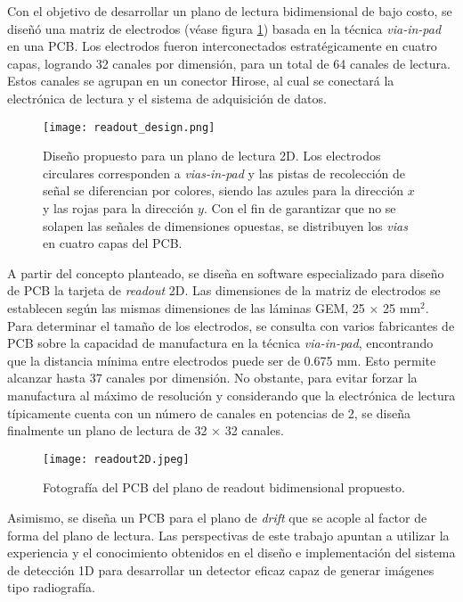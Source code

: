 \documentclass{report}
\begin{document}
\noindent Con el objetivo de desarrollar un plano de lectura bidimensional de bajo costo, se diseñó una matriz de electrodos (véase figura \ref{fig:readout_design}) basada en la técnica \textit{via-in-pad} en una PCB. Los electrodos fueron interconectados estratégicamente en cuatro capas, logrando 32 canales por dimensión, para un total de 64 canales de lectura. Estos canales se agrupan en un conector Hirose, al cual se conectará la electrónica de lectura y el sistema de adquisición de datos.  

\begin{figure}[H]
    \centering
    \texttt{[image: readout\_design.png]}
    \caption{Diseño propuesto para un plano de lectura 2D. Los electrodos circulares corresponden a \textit{vias-in-pad} y las pistas de recolección de señal se diferencian por colores, siendo las azules para la dirección $x$ y las rojas para la dirección $y$. Con el fin de garantizar que no se solapen las señales de dimensiones opuestas, se distribuyen los \textit{vias} en cuatro capas del PCB.  
    }
    \label{fig:readout_design}
\end{figure}

\noindent A partir del concepto planteado, se diseña en software especializado para diseño de PCB la tarjeta de \textit{readout} 2D. Las dimensiones de la matriz de electrodos se establecen según las mismas dimensiones de las láminas GEM, 25 × 25 mm$^2$.\\

\noindent Para determinar el tamaño de los electrodos, se consulta con varios fabricantes de PCB sobre la capacidad de manufactura en la técnica \textit{via-in-pad}, encontrando que la distancia mínima entre electrodos puede ser de 0.675 mm. Esto permite alcanzar hasta 37 canales por dimensión. No obstante, para evitar forzar la manufactura al máximo de resolución y considerando que la electrónica de lectura típicamente cuenta con un número de canales en potencias de 2, se diseña finalmente un plano de lectura de 32 × 32 canales.

\begin{figure}[H]
    \centering
    \texttt{[image: readout2D.jpeg]}
    \caption{Fotografía del PCB del plano de readout bidimensional propuesto.}
    \label{fig:readout_design_PCB}
\end{figure}

\noindent Asimismo, se diseña un PCB para el plano de \textit{drift} que se acople al factor de forma del plano de lectura. Las perspectivas de este trabajo apuntan a utilizar la experiencia y el conocimiento obtenidos en el diseño e implementación del sistema de detección 1D para desarrollar un detector eficaz capaz de generar imágenes tipo radiografía.  
\end{document}
